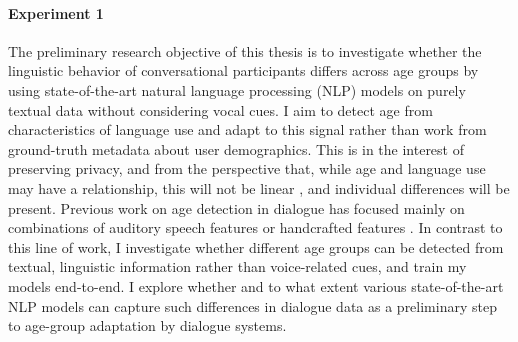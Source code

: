 \paragraph{Experiment 1} The preliminary research objective of this thesis is to investigate whether the linguistic behavior of conversational participants differs across age groups by using state-of-the-art natural language processing (NLP) models on purely textual data without considering vocal cues.
I aim to detect age from characteristics of language use and adapt to this signal rather than work from ground-truth metadata about user demographics.
This is in the interest of preserving privacy, and from the perspective that, while age and language use may have a relationship, this will not be linear \citep{pennebaker2003words}, and individual differences will be present. 
Previous work on age detection in dialogue has focused mainly on combinations of auditory speech features or handcrafted features \citep{schler2006effects, wolters2009age, li2013automatic}.
In contrast to this line of work, I investigate whether different age groups can be detected from textual, linguistic information rather than voice-related cues, and train my models end-to-end. I explore whether and to what extent various state-of-the-art NLP models can capture such differences in dialogue data as a preliminary step to age-group adaptation by dialogue systems.


